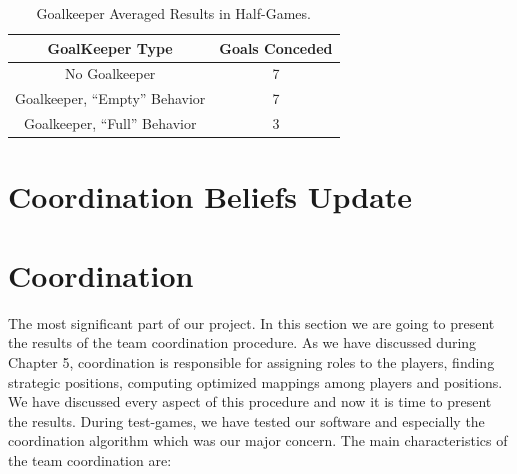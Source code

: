 \begin{table}[h!]
\begin{center}
\begin{footnotesize}
    \begin{tabular}{cc}
    \textbf{GoalKeeper Type} 	& \textbf{Goals Conceded}\\
    \midrule
    No Goalkeeper						& 7\\
    Goalkeeper, ``Empty'' Behavior	& 7\\
    Goalkeeper, ``Full'' Behavior	& 3\\
    \end{tabular}
    \end{footnotesize}
\end{center}

\label{GoalKeeperResults}
\caption{Goalkeeper Averaged Results in Half-Games.}
\end{table}


\section{Coordination Beliefs Update}

\section{Coordination}
The most significant part of our project. In this section we are going to present the results of the team coordination procedure. As we have discussed during Chapter 5, coordination is responsible for assigning roles to the players, finding strategic positions, computing optimized mappings among players and positions. We have discussed every aspect of this procedure and now it is time to present the results. During test-games, we have tested our software and especially the coordination algorithm which was our major concern. The main characteristics of the team coordination are:

